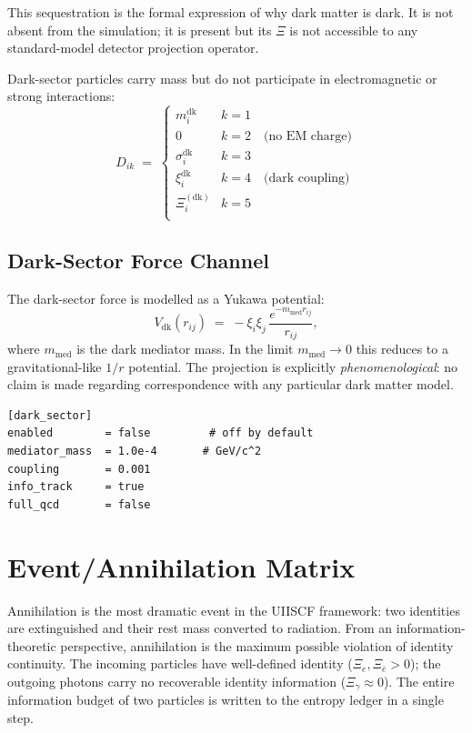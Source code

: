 \documentclass[11pt,a4paper]{article}
\newcommand{\Rec}{\Xi}
\begin{document}
This sequestration is the formal expression of why dark matter is dark.
It is not absent from the simulation; it is present but its $\Rec$ is not
accessible to any standard-model detector projection operator.

Dark-sector particles carry mass but do not participate in electromagnetic
or strong interactions:
\[
  D_{ik} \;=\;
  \begin{cases}
    m_i^{\mathrm{dk}}    & k=1 \\
    0                    & k=2 \quad\text{(no EM charge)} \\
    \sigma_i^{\mathrm{dk}} & k=3 \\
    \xi_i^{\mathrm{dk}}  & k=4 \quad\text{(dark coupling)} \\
    \Rec_i^{(\mathrm{dk})} & k=5 \\
  \end{cases}
\]

\subsection{Dark-Sector Force Channel}

The dark-sector force is modelled as a Yukawa potential:
\[
  V_{\mathrm{dk}}(r_{ij}) \;=\;
  -\xi_i \xi_j \, \frac{e^{-m_{\mathrm{med}} r_{ij}}}{r_{ij}} ,
\]
where $m_{\mathrm{med}}$ is the dark mediator mass.  In the limit
$m_{\mathrm{med}} \to 0$ this reduces to a gravitational-like $1/r$ potential.
The projection is explicitly \emph{phenomenological}: no claim is made
regarding correspondence with any particular dark matter model.

\begin{lstlisting}[language={}, caption={Dark-sector configuration block.}]
[dark_sector]
enabled        = false         # off by default
mediator_mass  = 1.0e-4       # GeV/c^2
coupling       = 0.001
info_track     = true
full_qcd       = false
\end{lstlisting}

\section{Event/Annihilation Matrix}\label{sec:annihilation}

Annihilation is the most dramatic event in the UIISCF framework: two
identities are extinguished and their rest mass converted to radiation.
From an information-theoretic perspective, annihilation is the maximum
possible violation of identity continuity.  The incoming particles have
well-defined identity ($\Rec_e, \Rec_{\bar e} > 0$); the outgoing photons
carry no recoverable identity information ($\Rec_\gamma \approx 0$).
The entire information budget of two particles is written to the entropy
ledger in a single step.
\end{document}
